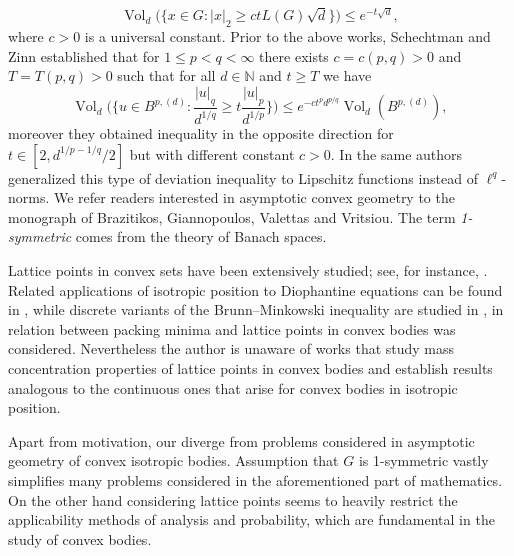 \documentclass[10pt,a4paper]{amsart}
\numberwithin{equation}{section}
\newcommand{\N}{\mathbb{N}}
\DeclareMathOperator{\Vol}{Vol}
\begin{document}
\[
\Vol_d\Big( \Big\{x \in G: |x|_2 \ge ct L(G) \sqrt{d} \Big\}\Big) \le e^{-t\sqrt{d}},
\]
where $c>0$ is a universal constant.
Prior to the above works, Schechtman and Zinn \cite{SZ} established that for $1 \le p<q< \infty$ there exists $c=c(p,q)>0$ and $T=T(p,q)>0$ such that for all $d\in \N$ and $t \ge T$ we have 
\[
 \Vol_d\Big(\Big\{ u \in B^{p,(d)}: \frac{|u|_q}{d^{1/q}} \ge t \frac{|u|_p}{d^{1/p}}\Big\} \Big) \le  e^{-ct^pd^{p/q}}\Vol_d(B^{p,(d)}),
\]
moreover they obtained inequality in the opposite direction for $t \in [2, d^{1/p-1/q}/2]$ but with different constant $c>0$. In \cite{SZ2} the same authors generalized this type of deviation inequality to Lipschitz functions instead of $\ell^q$-norms.
We refer readers interested in asymptotic convex geometry to the monograph \cite{conv book} of Brazitikos, Giannopoulos, Valettas and Vritsiou. The term \textit{1-symmetric} comes from the theory of Banach spaces.
\par Lattice points in convex sets have been extensively studied; see, for instance, \cite{matusek}. Related applications of isotropic position to Diophantine equations can be found in \cite{He}, while discrete variants of the Brunn--Minkowski inequality are studied in \cite{INZ,HKS}, in \cite{HSX} relation between packing minima and lattice points in convex bodies was considered.
Nevertheless the author is unaware of works that study mass concentration properties of lattice points in convex bodies and establish results analogous to the continuous ones that arise for convex bodies in isotropic position.
\par 
Apart from motivation, our diverge from problems considered in asymptotic geometry of convex isotropic bodies. Assumption that $G$ is 1-symmetric vastly simplifies many problems considered in the aforementioned part of mathematics. On the other hand considering lattice points seems to heavily restrict the applicability methods of analysis and probability, which are fundamental in the study of convex bodies.
\end{document}
